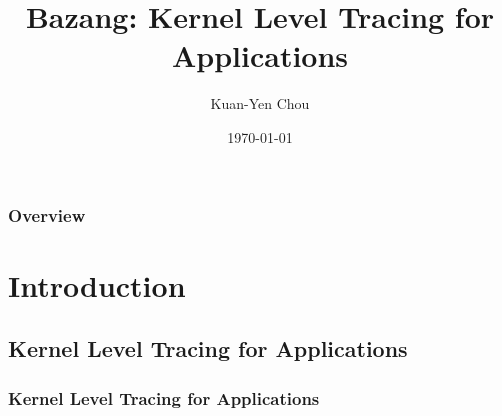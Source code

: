 \documentclass[10pt]{beamer}
\title[Bazang: Kernel Level Tracing for Applications]{Bazang: Kernel Level Tracing for Applications}
\author{Kuan-Yen Chou}
\institute[UIUC] {
    University of Illinois at Urbana-Champaign \\ %
    \medskip
    \textit{kychou2@illinois.edu} %
}
\date{\today} %
\begin{document}
\begin{frame}
\titlepage %
\end{frame}

\begin{frame}
\frametitle{Overview} %
\begin{NoHyper}
\tableofcontents
\end{NoHyper}
\end{frame}


\section{Introduction}


\subsection{Kernel Level Tracing for Applications}
\begin{frame}
\frametitle{Kernel Level Tracing for Applications}

\end{frame}
\end{document}
